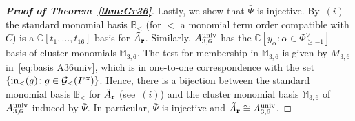 \documentclass[pdftex]{sigma}%
\numberwithin{equation}{section}
\DeclareMathOperator{\init}{in}
\begin{document}
\begin{proof}[{\bf Proof of Theorem~\ref{thm:Gr36}}]
 \medskip

 Lastly, we show that $\bar \Psi$ is injective.
 By~$(i)$ the standard monomial basis $\mathbb B_{<}$ (for $<$ a monomial term order compatible with $C$) is a $\mathbb C[t_1,\dots,t_{16}]$-basis for $\tilde A_{\bf r}$.
 Similarly, $A_{3,6}^{\rm univ}$ has the $\mathbb C[y_\alpha\colon \alpha\in \Phi^{\vee}_{\ge -1}]$-basis of cluster monomials $\mathbb M_{3,6}$.
 The test for membership in $\mathbb M_{3,6}$ is given by $M_{3,6}$ in~\eqref{eq:basis A36univ}, which is in one-to-one correspondence with the set $\{\init_<(g)\colon g\in \mathcal G_<(I^{\rm ex})\}$.
 Hence, there is a bijection between the standard monomial basis $\mathbb B_{<}$ for $\tilde A_{\bf r}$ (see~$(i)$) and the cluster monomial basis $\mathbb M_{3,6}$ of $A_{3,6}^{\rm univ}$ induced by $\bar \Psi$.
 In particular, $\bar \Psi$ is injective and $\tilde A_{\bf r}\cong A_{3,6}^{\rm univ}$.


\end{proof}
\end{document}
